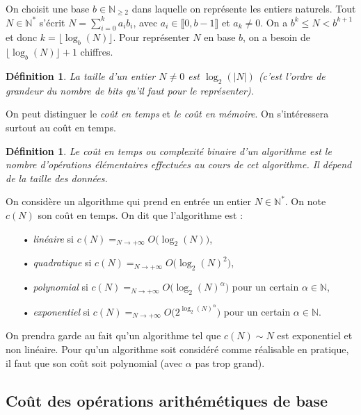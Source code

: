 \documentclass[12pt]{report}
\newtheorem{definition}[thm]{Définition}
\newcommand{\N}{\mathbb{N}}
\begin{document}
On choisit une base $b\in\N_{\geq 2}$ dans laquelle on représente les entiers naturels. Tout $N\in \N^*$ s'écrit $N=\sum_{i=0}^k a_i b_i$, avec $a_i\in \llbracket 0,b-1\rrbracket$ et $a_k\neq 0$. On a  $b^k\leq N<b^{k+1}$ et donc $k=\lfloor \log_b(N)\rfloor$. Pour représenter $N$ en base $b$, on a besoin de $\lfloor \log_b(N)\rfloor+1$ chiffres. 

\begin{definition}
La taille d'un entier $N\neq 0$ est $\log_2(|N|)$ (c'est l'ordre de grandeur du  nombre de  bits qu'il faut pour le représenter).
\end{definition}


On peut distinguer le \textit{coût en temps} et \textit{le coût en mémoire}. On s'intéressera surtout au coût en temps.

\begin{definition}
Le \textit{coût en temps} ou \textit{complexité binaire} d'un algorithme est le nombre d'opérations élémentaires effectuées au cours de cet algorithme. Il dépend de la taille des données.
\end{definition}



On considère un algorithme qui prend en entrée un entier $N\in \N^*$. On note $c(N)$ son coût en temps. On dit que l'algorithme est :\begin{itemize}
\item[•] \textit{linéaire} si $c(N)=_{N\rightarrow +\infty} O\big(\log_2(N)\big)$,

\item[•] \textit{quadratique} si $c(N)=_{N\rightarrow +\infty}O\big(\log_2(N)^2)$,

\item[•] \textit{polynomial} si $c(N)=_{N\rightarrow +\infty}O\big(\log_2(N)^\alpha\big)$ pour un certain $\alpha\in \N$,

\item[•] \textit{exponentiel} si $c(N)=_{N\rightarrow +\infty}O\big(2^{\log_2(N)^\alpha}\big)$ pour un certain $\alpha\in \N$.


\end{itemize} 

On prendra garde au fait qu'un algorithme tel que $c(N)\sim N$ est exponentiel et non linéaire. Pour qu'un algorithme soit considéré comme réalisable en pratique, il faut que son coût soit polynomial (avec $\alpha$ pas trop grand).


\subsection{Coût des opérations arithémétiques de base}
\end{document}
